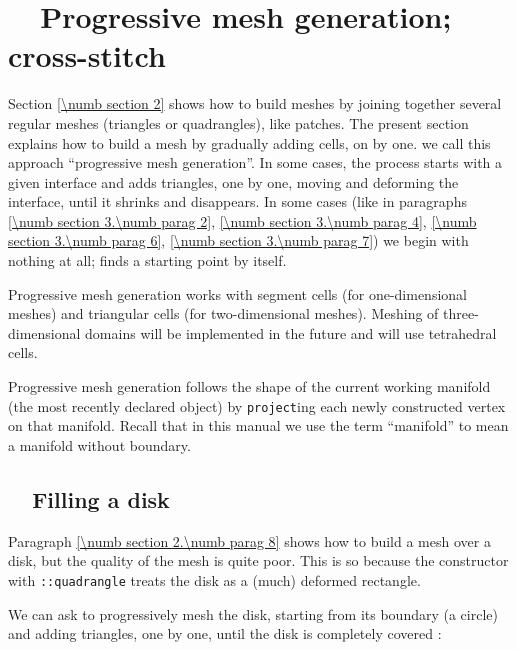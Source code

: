 
\chapter{~~Progressive mesh generation; cross-stitch}\label{\numb section 3}

Section \ref{\numb section 2} shows how to build meshes by joining together several regular meshes
(triangles or quadrangles), like patches.
The present section explains how to build a mesh by gradually adding cells, on by one.
we call this approach ``progressive mesh generation''.
In some cases, the process starts with a given interface and adds triangles, one by one,
moving and deforming the interface, until it shrinks and disappears.
In some cases (like in paragraphs \ref{\numb section 3.\numb parag 2},
\ref{\numb section 3.\numb parag 4}, \ref{\numb section 3.\numb parag 6},
\ref{\numb section 3.\numb parag 7}) we begin with nothing at all;
{\maniFEM} finds a starting point by itself.

Progressive mesh generation works with segment cells (for one-dimensional meshes) and
triangular cells (for two-dimensional meshes).
Meshing of three-dimensional domains will be implemented in the future and will use tetrahedral
cells.

Progressive mesh generation follows the shape of the current working manifold (the most recently
declared {\small\tt {}} object) by {\small\tt project}ing each newly constructed vertex
on that manifold.
Recall that in this manual we use the term ``manifold'' to mean a manifold without boundary.


\section{~~Filling a disk}\label{\numb section 3.\numb parag 1}

Paragraph \ref{\numb section 2.\numb parag 8} shows how to build a mesh over a disk,
but the quality of the mesh is quite poor.
This is so because the {\small\tt {}} constructor with {\small\tt {}::quadrangle} treats the
disk as a (much) deformed rectangle.

We can ask {\maniFEM} to progressively mesh the disk, starting from its boundary (a circle)
and adding triangles, one by one, until the disk is completely covered :


